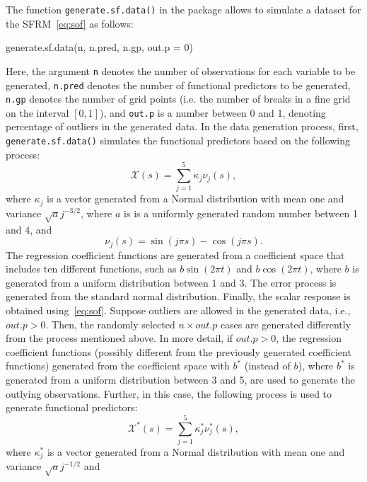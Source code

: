 The function \texttt{generate.sf.data()} in the package  allows to simulate a dataset for the SFRM~\eqref{eq:sof} as follows:
\begin{smallexample}
\begin{smallverbatim}
generate.sf.data(n, n.pred, n.gp, out.p = 0)
\end{smallverbatim}
\end{smallexample}
Here, the argument \texttt{n} denotes the number of observations for each variable to be generated, \texttt{n.pred} denotes the number of functional predictors to be generated, \texttt{n.gp} denotes the number of grid points (i.e. the number of breaks in a fine grid on the interval $[0, 1]$), and \texttt{out.p} is a number between 0 and 1, denoting percentage of outliers in the generated data. In the data generation process, first, \texttt{generate.sf.data()} simulates the functional predictors based on the following process:
\begin{equation*}
\mathcal{X}(s) = \sum_{j=1}^5 \kappa_j \nu_j(s),
\end{equation*}
where $\kappa_j$ is a vector generated from a Normal distribution with mean one and variance $\sqrt{a}j^{-3/2}$, where $a$ is is a uniformly generated random number between 1 and 4, and
\begin{equation*}
\nu_j(s) = \sin (j \pi s) - \cos (j \pi s).
\end{equation*}
The regression coefficient functions are generated from a coefficient space that includes ten different functions, such as $b \sin(2 \pi t)$ and $b \cos(2 \pi t)$, where $b$ is generated from a uniform distribution between 1 and 3. The error process is generated from the standard normal distribution. Finally, the scalar response is obtained using~\eqref{eq:sof}. Suppose outliers are allowed in the generated data, i.e., $out.p > 0$. Then, the randomly selected $ n \times out.p$ cases are generated differently from the process mentioned above. In more detail, if $out.p > 0$, the regression coefficient functions (possibly different from the previously generated coefficient functions) generated from the coefficient space with $b^*$ (instead of $b$), where $b^*$ is generated from a uniform distribution between 3 and 5, are used to generate the outlying observations. Further, in this case, the following process is used to generate functional predictors:
\begin{equation*}
\mathcal{X}^*(s) = \sum_{j=1}^5 \kappa_j^* \nu_j^*(s),
\end{equation*}
where $\kappa_j^*$ is a vector generated from a Normal distribution with mean one and variance $\sqrt{a}j^{-1/2}$ and
